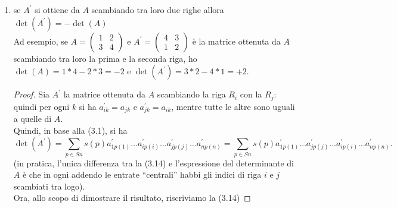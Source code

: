 \begin{enumerate}
\begin{proof}
			allora la riga i-esima della matrice\\
			$A^\prime$ è $R_i+v+\begin{pmatrix}a_{i1}+v_{i1} & a_{i2}+v_{i2} & 
			\dots & a_{in}+v_{in}\end{pmatrix}$
			In base alla definizione (<++>) di determinante, si ha
			$\det(A^\prime)=\sum s(p)a_{ip(1)}\dots (a_{ip(i)}+v_{ip(i)})\dots a
			_{np(n)}=\sum s(p)a_{ip(1)}\dots a_{ip(i)}\dots a_{np(n)}+\sum s(p)a
			_{ip(1)}\dots v_{ip(i)}\dots a_{np(n)}$ ovvero 
			$\det(A)+\det\begin{pmatrix}R_1\\ \dots\\ v\\ \dots\\ 
			R_n\end{pmatrix}$, come volevamo.
		\end{proof}
    \item se $A^\prime$ si ottiene da $A$ scambiando tra loro due righe allora $\det(A^\prime)=-\det(A)$\\
		Ad esempio, se $A=\begin{pmatrix} 1 & 2 \\ 3 & 4 \end{pmatrix}$ e
			  $A^{\prime}=\begin{pmatrix} 4 & 3 \\ 1 & 2 \end{pmatrix}$ è la
			  matrice ottenuta da $A$ scambiando tra loro la prima e la seconda
			  riga, ho $\det(A)=1*4-2*3=-2$ e $\det(A^\prime)=3*2-4*1=+2$.
		\begin{proof}
			Sia $A^\prime$ la matrice ottenuta da $A$ scambiando la riga $R_i$
			con la $R_j$: quindi per ogni $k$ si ha $a^\prime_{ik}=a_{jk}$ e
			$a^\prime_{jk}=a_{ik}$, mentre tutte le altre sono uguali a quelle
			di $A$.\\
			Quindi, in base alla (3.1), si ha
			\begin{equation}
				\det(A^\prime) = \sum_{p\in Sn} s(p) a^\prime_{1p(1)}\dots
				a^\prime_{ip(i)}\dots a^\prime_{jp(j)}\dots a^\prime_{np(n)} =
				\sum_{p\in Sn} s(p) a^\prime_{1p(1)}\dots
				a^\prime_{jp(j)}\dots a^\prime_{ip(i)}\dots a^\prime_{np(n)}.
			\end{equation}
			(in pratica, l'unica differenza tra la (3.14) e l'espressione del
			determinante di $A$ è che in ogni addendo le entrate ``centrali''
			habbi gli indici di riga $i$ e $j$ scambiati tra logo).\\
			Ora, allo scopo di dimostrare il risultato, riscriviamo la (3.14)

\end{proof}
\end{enumerate}
